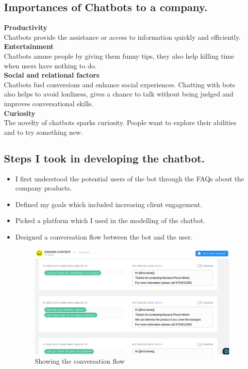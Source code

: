 \subsection{Importances of Chatbots to a company.}
\normalsize{\bf Productivity} \\
Chatbots provide the assistance or access to information quickly and efficiently.\\
\normalsize{\bf Entertainment} \\
Chatbots amuse people by giving them funny tips, they also help killing time when users have nothing to do.\\
\normalsize{\bf Social and relational factors} \\
Chatbots fuel conversions and enhance social experiences. Chatting with bots also helps to avoid lonliness, gives a chance to talk without being judged and improves conversational skills.\\
\normalsize{\bf Curiosity} \\
The novelty of chatbots sparks curiosity. People want to explore their abilities and to try something new.\\
\subsection{Steps I took in developing the chatbot.}
\begin{itemize}
\item I first understood the potential users of the bot through the FAQs about the company products.
\item Defined my goals which included increasing client engagement.
\item Picked a platform which I used in the modelling of the chatbot.
\item Designed a conversation flow between the bot and the user\cite{chatbot}.
\begin{figure}[h!]
\begin{center}
	\includegraphics[scale= 0.4]{img/chatfuel.png}
	\caption{Showing the conversation flow }
	\label{fig:symbols}
\end{center}
\end{figure}

\end{itemize}

